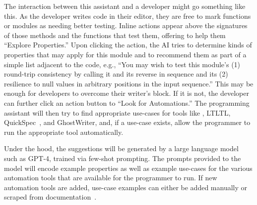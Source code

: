 The interaction between this assistant and a developer might go
something like this. As the
developer writes code in their editor, they are free to mark functions or
modules as needing better testing.
Inline actions appear
above the signatures of those methods and the
functions that test them, offering to help them ``Explore Properties.''
Upon clicking the action, the AI tries to determine
kinds of properties that may apply for this module
and to recommend them as part of a simple list adjacent to the
code, e.g., ``You may wish to test this module's (1) round-trip consistency by
calling it and its reverse in sequence and its (2) resilience to null values in
arbitrary positions in the input sequence.'' This may be enough for developers
to overcome their writer's block. If it is not, the developer can further click
an action button to ``Look for Automations.'' The programming assistant will
then try to find appropriate use-cases for tools like {\Mica}, LTLTL,
QuickSpec~\cite{ref:claessen2010quickspec}, and GhostWriter, and, if a use-case
exists, allow the programmer to run the appropriate tool automatically.

Under the hood, the suggestions will be generated by a large language model
such as GPT-4, trained via few-shot prompting. The prompts provided to the model
will encode example properties as well as example use-cases for the various
automation tools that are available for the programmer to run. If new automation
tools are added, use-case examples can either be added manually or scraped from
documentation~\cite{zhu2023kani}.


